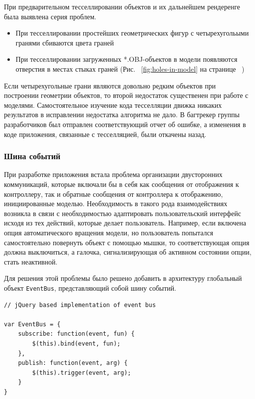 \documentclass[12pt, a4paper]{article}
\begin{document}
При предварительном тесселлировании объектов и их дальнейшем рендеренге была
выявлена серия проблем.

\begin{itemize}
    \item При тесселлировании простейших геометрических фигур с четырехугольыми
    гранями сбиваются цвета граней
    \item При тесселлировании загруженных *.OBJ-объектов в модели появляются
    отверстия в местах стыках граней (Рис. ~\ref{fig:holes-in-model} на странице
    ~\pageref{fig:holes-in-model})
\end{itemize}


Если четырехугольные грани являются довольно редким объектов при построении
геометрии объектов, то второй недостаток существенен при работе с моделями.
Самостоятельное изучение кода тесселляции движка никаких результатов в
исправлении недостатка алгоритма не дало. В багтрекер группы разработчиков был
отправлен соответствующий отчет об ошибке, а изменения в коде приложения,
связанные с тесселляцией, были откачены назад.

\subsubsection{Шина событий}
При разработке приложения встала проблема организации двусторонних коммуникаций,
которые включали бы в себя как сообщения от отображения к контроллеру, так и
обратные сообщения от контроллера к отображению, инициированные моделью.
Необходимость в такого рода взаимодействиях возникла в связи с необходимостью
адаптировать пользовательский интерфейс исходя из тех действий, которые делает
пользователь. Например, если включена опция автоматического вращения модели,
но пользователь попытался самостоятельно повернуть объект с помощью мышки, то
соответствующая опция должна выключиться, а галочка, сигнализирующая об активном
состоянии опции, стать неактивной.

Для решения этой проблемы было решено добавить в архитектуру глобальный объект
\texttt{EventBus}, представляющий собой шину событий.

\begin{lstlisting}
// jQuery based implementation of event bus

var EventBus = {
    subscribe: function(event, fun) {
        $(this).bind(event, fun);
    },
    publish: function(event, arg) {
        $(this).trigger(event, arg);
    }
}
\end{lstlisting}
\end{document}
